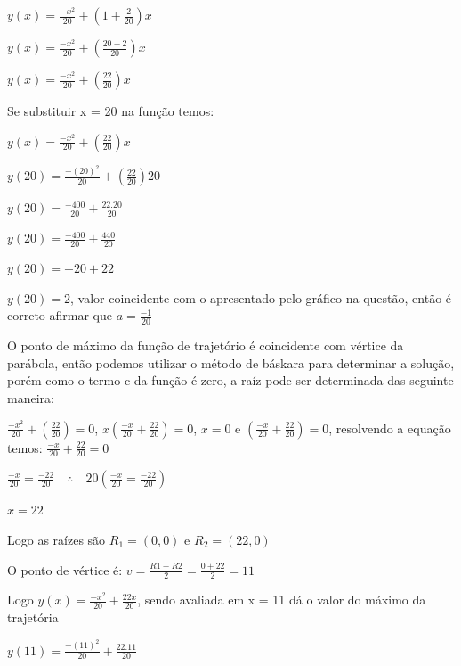 \begin{multicols*}{2}
            
            $y(x) = \frac{-x^2}{20} + \left( 1 + \frac{2}{20} \right)x$
            
            $y(x) = \frac{-x^2}{20} + \left(  \frac{20 +2 }{20} \right)x$
            
            $y(x) = \frac{-x^2}{20} + \left(  \frac{22 }{20} \right)x$
            
            Se substituir x = 20 na função temos:
            
            $y(x) = \frac{-x^2}{20} + \left(  \frac{22 }{20} \right)x$
            
            $y(20) = \frac{-(20)^2}{20} + \left(  \frac{22 }{20} \right)20$
            
            $y(20) = \frac{-400}{20} + \frac{22 . 20}{20}$
            
            $y(20) = \frac{-400}{20} + \frac{440}{20}$
    
            $y(20) = -20 + 22$
            
            $y(20) = 2$, valor coincidente com o apresentado pelo gráfico na questão, então é correto 				afirmar que $a = \frac{-1}{20}$
                    
            O ponto de máximo da função de trajetório é coincidente com vértice da parábola, então podemos 			utilizar o método de báskara para determinar a solução, porém como o termo c da função é zero, 			a raíz pode ser determinada das seguinte maneira:
            
            $\frac{-x^2}{20} + \left(  \frac{22 }{20} \right) = 0$,		
            $x \left(    \frac{-x}{20} + \frac{22}{20} \right) = 0$,
            $x = 0$ e $\left(    \frac{-x}{20} + \frac{22}{20} \right) = 0$, resolvendo a equação temos:
            $    \frac{-x}{20} + \frac{22}{20}  = 0$
            
            $\frac{-x}{20} = \frac{- 22}{20} \quad \therefore \quad 
            20 \left( \frac{-x}{20} = \frac{- 22}{20} \right)$
            
            $x = 22$
            
            Logo as raízes são $R_1 = (0,0)$ e $R_2 = (22,0)$
            
            O ponto de vértice é: $v =\frac{R1 + R2}{2} =\frac{0 + 22}{2} = 11 $
            
            Logo $y(x) = \frac{-x^2}{20} + \frac{22x}{20}$, sendo avaliada em x = 11 dá o valor do máximo 			da trajetória
            
            $y(11) = \frac{-(11)^2}{20} + \frac{22.11}{20} $
            

\end{multicols*}
